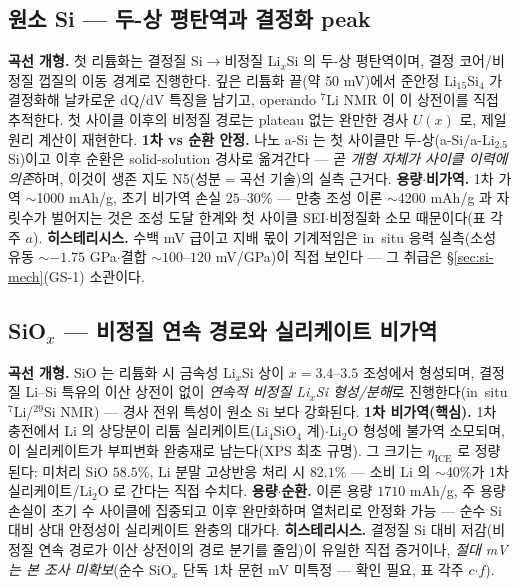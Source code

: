\subsection{원소 Si --- 두-상 평탄역과 결정화 peak}\label{ssec:si-elemental}
\textbf{곡선 개형.} 첫 리튬화는 결정질 Si$\to$비정질 Li$_x$Si 의 두-상 평탄역이며, 결정 코어/비정질 껍질의
이동 경계로 진행한다\cite{limthongkul2003,li_dahn2007}. 깊은 리튬화 끝(약 $50$
mV)에서 준안정 Li$_{15}$Si$_4$ 가 결정화해 날카로운 dQ/dV 특징을 남기고\cite{obrovac_christensen2004},
operando $^7$Li NMR 이 이 상전이를 직접 추적한다\cite{ogata_nmr2014}. 첫 사이클 이후의 비정질 경로는
plateau 없는 완만한 경사 $U(x)$ 로, 제일원리 계산이 재현한다\cite{chevrier_dahn2009}.
\textbf{1차 vs 순환 안정.} 나노 a-Si 는 첫 사이클만 두-상(a-Si$/$a-Li$_{2.5}$Si)이고 이후 순환은
solid-solution 경사로 옮겨간다\cite{wang_asi2013,mcdowell_coreshell2013} --- 곧 \emph{개형 자체가 사이클 이력에 의존}하며, 이것이
생존 지도 N5(성분$=$곡선 기술)의 실측 근거다. \textbf{용량$\cdot$비가역.} 1차 가역 $\sim$1000 mAh/g,
초기 비가역 손실 $25$--$30\%$\cite{limthongkul2003} --- 만충 조성 이론 $\sim$4200 mAh/g\cite{wen_huggins1981}
과 자릿수가 벌어지는 것은 조성 도달 한계와 첫 사이클 SEI$\cdot$비정질화 소모 때문이다(표 각주 $a$).
\textbf{히스테리시스.} 수백 mV 급이고 지배 몫이 기계적임은 in~situ 응력 실측(소성 유동 $\sim-1.75$
GPa$\cdot$결합 $\sim100$--$120$ mV/GPa)이 직접 보인다\cite{sethuraman_stressevo2010,sethuraman_stresspot2010}
--- 그 취급은 \S\ref{sec:si-mech}(GS-1) 소관이다.

\subsection{SiO$_x$ --- 비정질 연속 경로와 실리케이트 비가역}\label{ssec:si-siox}
\textbf{곡선 개형.} SiO 는 리튬화 시 금속성 Li$_x$Si 상이 $x{=}3.4$--$3.5$ 조성에서 형성되며, 결정질 Li--Si
특유의 이산 상전이 없이 \emph{연속적 비정질 Li$_x$Si 형성/분해}로 진행한다(in~situ $^7$Li/$^{29}$Si
NMR)\cite{kitada_sio2019} --- 경사 전위 특성이 원소 Si 보다 강화된다. \textbf{1차 비가역(핵심).} 1차
충전에서 Li 의 상당분이 리튬 실리케이트(Li$_4$SiO$_4$ 계)$\cdot$Li$_2$O 형성에 불가역 소모되며, 이
실리케이트가 부피변화 완충재로 남는다(XPS 최초 규명\cite{miyachi_sio2005}). 그 크기는 $\eta_\mathrm{ICE}$
로 정량된다: 미처리 SiO $58.5\%$, Li 분말 고상반응 처리 시 $82.1\%$\cite{yom_sio2016} --- 소비 Li 의
$\sim$40\%가 1차 실리케이트/Li$_2$O 로 간다는 직접 수치다. \textbf{용량$\cdot$순환.} 이론 용량 $1710$
mAh/g, 주 용량손실이 초기 수 사이클에 집중되고 이후 완만화하며 열처리로 안정화 가능\cite{zhang_sio2018}
--- 순수 Si 대비 상대 안정성이 실리케이트 완충의 대가다. \textbf{히스테리시스.} 결정질 Si 대비 저감(비정질
연속 경로가 이산 상전이의 경로 분기를 줄임)이 유일한 직접 증거\cite{kitada_sio2019}이나, \emph{절대 mV 는
본 조사 미확보}(순수 SiO$_x$ 단독 1차 문헌 mV 미특정 --- 확인 필요, 표 각주 $c$$\cdot$$f$).

